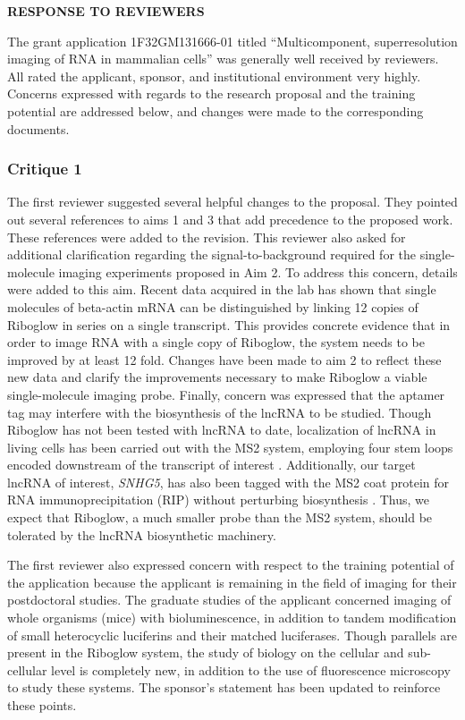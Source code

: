 


\begin{center}
{\bf RESPONSE TO REVIEWERS}
\end{center}
The grant application 1F32GM131666-01 titled ``Multicomponent, superresolution imaging of RNA in mammalian cells'' was generally well received by reviewers. All rated the applicant, sponsor, and institutional environment very highly. Concerns expressed with regards to the research proposal and the training potential are addressed below, and changes were made to the corresponding documents.

\subsubsection*{Critique 1}
The first reviewer suggested several helpful changes to the proposal. They pointed out several references to aims 1 and 3 that add precedence to the proposed work. These references were added to the revision. This reviewer also asked for additional clarification regarding the signal-to-background required for the single-molecule imaging experiments proposed in Aim 2. To address this concern, details were added to this aim. Recent data acquired in the lab has shown that single molecules of beta-actin mRNA can be distinguished by linking 12 copies of Riboglow in series on a single transcript. This provides concrete evidence that in order to image RNA with a single copy of Riboglow, the system needs to be improved by at least 12 fold. Changes have been made to aim 2 to reflect these new data and clarify the improvements necessary to make Riboglow a viable single-molecule imaging probe. Finally, concern was expressed that the aptamer tag may interfere with the biosynthesis of the lncRNA to be studied. Though Riboglow has not been tested with lncRNA to date, localization of lncRNA in living cells has been carried out with the MS2 system, employing four stem loops encoded downstream of the transcript of interest \cite{YoonLincRNAp21SuppressesTarget2012}. Additionally, our target lncRNA of interest, \textit{SNHG5}, has also been tagged with the MS2 coat protein for RNA immunoprecipitation (RIP) without perturbing biosynthesis \cite{HeLncRNASNHG5regulates2017}. Thus, we expect that Riboglow, a much smaller probe than the MS2 system, should be tolerated by the lncRNA biosynthetic machinery.

The first reviewer also expressed concern with respect to the training potential of the application because the applicant is remaining in the field of imaging for their postdoctoral studies. The graduate studies of the applicant concerned imaging of whole organisms (mice) with bioluminescence, in addition to tandem modification of small heterocyclic luciferins and their matched luciferases. Though parallels are present in the Riboglow system, the study of biology on the cellular and sub-cellular level is completely new, in addition to the use of fluorescence microscopy to study these systems. The sponsor's statement has been updated to reinforce these points.

